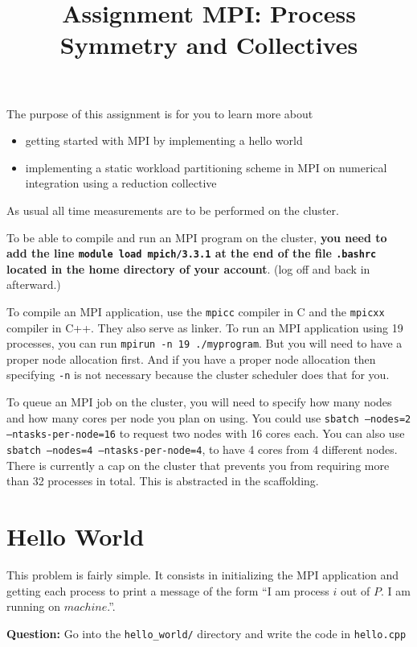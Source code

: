\documentclass{article}
\title{Assignment MPI: Process Symmetry and Collectives}
\date{}
\newcommand{\question}{{\noindent \bf Question: }}
\begin{document}
\maketitle

The purpose of this assignment is for you to learn more about
\begin{itemize}
\item getting started with MPI by implementing a hello world
\item implementing a static workload partitioning scheme in MPI on numerical integration using a reduction collective
\end{itemize}

As usual all time measurements are to be performed on the cluster.

To be able to compile and run an MPI program on the cluster, {\bf you need to add
	the line \texttt{module load mpich/3.3.1} at the end of the file
	\texttt{.bashrc} located in the home directory of your account}. (log off and back in afterward.)

To compile an MPI application, use the \texttt{mpicc} compiler in C
and the \texttt{mpicxx} compiler in C++. They also serve as linker.
To run an MPI application using 19 processes, you can run
\texttt{mpirun -n 19 ./myprogram}. But you will need to have a proper
node allocation first. And if you have a proper node allocation then
specifying \texttt{-n} is not necessary because the cluster scheduler
does that for you.

To queue an MPI job on the cluster, you will need to specify how many nodes
and how many cores per node you plan on using. You could use
\texttt{sbatch --nodes=2 --ntasks-per-node=16} to request two nodes with 16 cores each. You can also use \texttt{sbatch --nodes=4 --ntasks-per-node=4}, to have 4 cores from 4 different nodes. There is
currently a cap on the cluster that prevents you from requiring more than 32 processes in total. This is abstracted in the scaffolding.

\section{Hello World}

This problem is fairly simple. It consists in initializing the MPI
application and getting each process to print a message of the form
``I am process $i$ out of $P$. I am running on $machine$.''.

\question Go into the \texttt{hello\_world/} directory and write the
code in \texttt{hello.cpp}
\end{document}
